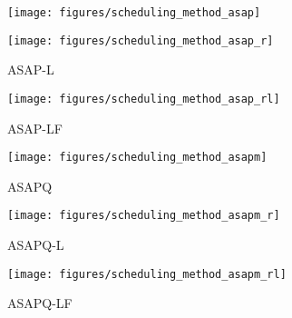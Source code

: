 \begin{figure*}[t]
	\centering
	\begin{subfigure}{0.30\textwidth}
      \centering
	   \texttt{[image: figures/scheduling\_method\_asap]}
      \vspace{-0.6cm}
	   \caption{}
      \vspace{0.2cm}
      \label{fig:asap}
	\end{subfigure}
	\begin{subfigure}{0.30\textwidth}
      \centering
	   \texttt{[image: figures/scheduling\_method\_asap\_r]}
      \vspace{-0.6cm}
	   \caption{ASAP-L}
      \vspace{0.2cm}
      \label{fig:asap_l}
	\end{subfigure}
	\begin{subfigure}{0.30\textwidth}
      \centering
	   \texttt{[image: figures/scheduling\_method\_asap\_rl]}
      \vspace{-0.6cm}
	   \caption{ASAP-LF}
      \vspace{0.2cm}
      \label{fig:asap_lf}
	\end{subfigure}
	\begin{subfigure}{0.30\textwidth}
      \centering
	   \texttt{[image: figures/scheduling\_method\_asapm]}
      \vspace{-0.6cm}
	   \caption{ASAPQ}
      \vspace{0.2cm}
      \label{fig:asapq}
	\end{subfigure}
	\begin{subfigure}{0.30\textwidth}
      \centering
	   \texttt{[image: figures/scheduling\_method\_asapm\_r]}
      \vspace{-0.6cm}
	   \caption{ASAPQ-L}
      \vspace{0.2cm}
      \label{fig:asapq_l}
	\end{subfigure}
	\begin{subfigure}{0.30\textwidth}
      \centering
	   \texttt{[image: figures/scheduling\_method\_asapm\_rl]}
      \vspace{-0.6cm}
	   \caption{ASAPQ-LF}
      \vspace{0.2cm}
      \label{fig:asapq_lf}
	\end{subfigure}


\end{figure*}
